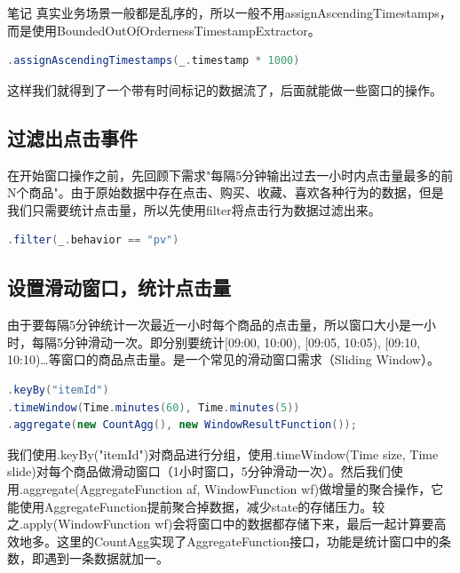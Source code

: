 \documentclass[oneside]{ctexbook}
\begin{document}
\begin{bclogo}[logo=\bcinfo, couleurBarre=orange, noborder=true, couleur=white]{笔记}
真实业务场景一般都是乱序的，所以一般不用assignAscendingTimestamps，而是使用BoundedOutOfOrdernessTimestampExtractor。
\end{bclogo}

\begin{lstlisting}[language=scala]
.assignAscendingTimestamps(_.timestamp * 1000)
\end{lstlisting}

这样我们就得到了一个带有时间标记的数据流了，后面就能做一些窗口的操作。

\subsection{过滤出点击事件}

在开始窗口操作之前，先回顾下需求"每隔5分钟输出过去一小时内点击量最多的前N个商品"。由于原始数据中存在点击、购买、收藏、喜欢各种行为的数据，但是我们只需要统计点击量，所以先使用filter将点击行为数据过滤出来。

\begin{lstlisting}[language=scala]
.filter(_.behavior == "pv")
\end{lstlisting}

\subsection{设置滑动窗口，统计点击量}

由于要每隔5分钟统计一次最近一小时每个商品的点击量，所以窗口大小是一小时，每隔5分钟滑动一次。即分别要统计[09:00, 10:00), [09:05, 10:05), [09:10, 10:10)…等窗口的商品点击量。是一个常见的滑动窗口需求（Sliding Window）。

\begin{lstlisting}[language=scala]
.keyBy("itemId")
.timeWindow(Time.minutes(60), Time.minutes(5))
.aggregate(new CountAgg(), new WindowResultFunction());
\end{lstlisting}

我们使用.keyBy("itemId")对商品进行分组，使用.timeWindow(Time size, Time slide)对每个商品做滑动窗口（1小时窗口，5分钟滑动一次）。然后我们使用.aggregate(AggregateFunction af, WindowFunction wf)做增量的聚合操作，它能使用AggregateFunction提前聚合掉数据，减少state的存储压力。较之.apply(WindowFunction wf)会将窗口中的数据都存储下来，最后一起计算要高效地多。这里的CountAgg实现了AggregateFunction接口，功能是统计窗口中的条数，即遇到一条数据就加一。
\end{document}
